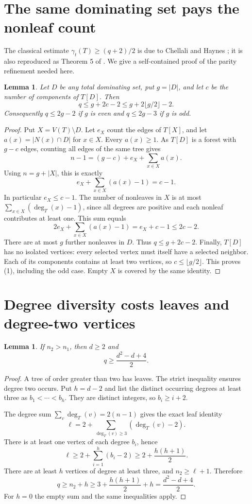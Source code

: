 \documentclass[11pt,a4paper]{article}
\newtheorem{lemma}[theorem]{Lemma}
\newcommand{\gt}{\gamma_t}
\begin{document}
\section{The same dominating set pays the nonleaf count}
The classical estimate $\gt(T)\ge(q+2)/2$ is due to Chellali and Haynes \cite{CH}; it is also reproduced as Theorem 5 of \cite{DLPW}. We give a self-contained proof of the parity refinement needed here.

\begin{lemma}\label{lem:parity}
Let $D$ be any total dominating set, put $g=|D|$, and let $c$ be the number of components of $T[D]$. Then
\[
 q\le g+2c-2\le g+2\lfloor g/2\rfloor-2. \tag{1}
\]
Consequently $q\le2g-2$ if $g$ is even and $q\le2g-3$ if $g$ is odd.
\end{lemma}
\begin{proof}
Put $X=V(T)\setminus D$. Let $e_X$ count the edges of $T[X]$, and let $a(x)=|N(x)\cap D|$ for $x\in X$. Every $a(x)\ge1$. As $T[D]$ is a forest with $g-c$ edges, counting all edges of the same tree gives
\[
 n-1=(g-c)+e_X+\sum_{x\in X}a(x).
\]
Using $n=g+|X|$, this is exactly
\[
 e_X+\sum_{x\in X}(a(x)-1)=c-1. \tag{2}
\]
In particular $e_X\le c-1$. The number of nonleaves in $X$ is at most $\sum_{x\in X}(\deg_T(x)-1)$, since all degrees are positive and each nonleaf contributes at least one. This sum equals
\[
 2e_X+\sum_{x\in X}(a(x)-1)=e_X+c-1\le2c-2.
\]
There are at most $g$ further nonleaves in $D$. Thus $q\le g+2c-2$. Finally, $T[D]$ has no isolated vertices: every selected vertex must itself have a selected neighbor. Each of its components contains at least two vertices, so $c\le\lfloor g/2\rfloor$. This proves (1), including the odd case. Empty $X$ is covered by the same identity.
\end{proof}

\section{Degree diversity costs leaves and degree-two vertices}
\begin{lemma}\label{lem:degrees}
If $n_2>n_1$, then $d\ge2$ and
\[
 q\ge\frac{d^2-d+4}{2}. \tag{3}
\]
\end{lemma}
\begin{proof}
A tree of order greater than two has leaves. The strict inequality ensures degree two occurs. Put $h=d-2$ and list the distinct occurring degrees at least three as $b_1<\cdots<b_h$. They are distinct integers, so $b_i\ge i+2$.

The degree sum $\sum_v\deg_T(v)=2(n-1)$ gives the exact leaf identity
\[
 \ell=2+\sum_{\deg_T(v)\ge3}(\deg_T(v)-2).
\]
There is at least one vertex of each degree $b_i$, hence
\[
 \ell\ge2+\sum_{i=1}^{h}(b_i-2)\ge2+\frac{h(h+1)}2.
\]
There are at least $h$ vertices of degree at least three, and $n_2\ge\ell+1$. Therefore
\[
 q\ge n_2+h\ge3+\frac{h(h+1)}2+h
   =\frac{d^2-d+4}{2}.
\]
For $h=0$ the empty sum and the same inequalities apply.
\end{proof}
\end{document}
